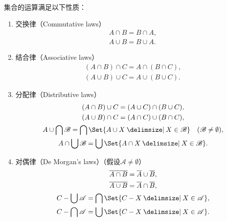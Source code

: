 \begin{property}
集合的运算满足以下性质：
\begin{enumerate}
\item 交换律（{\rm Commutative laws}）
\begin{gather}
A \cap B = B \cap A, \label{equation:集合论.集合代数公式1} \\
A \cup B = B \cup A. \label{equation:集合论.集合代数公式2}
\end{gather}

\item 结合律（{\rm Associative laws}）
\begin{gather}
(A \cap B) \cap C = A \cap (B \cap C), \label{equation:集合论.集合代数公式3} \\
(A \cup B) \cup C = A \cup (B \cup C). \label{equation:集合论.集合代数公式4}
\end{gather}

\item 分配律（{\rm Distributive laws}）
\begin{gather}
(A \cap B) \cup C = (A \cup C) \cap (B \cup C), \label{equation:集合论.集合代数公式5} \\
(A \cup B) \cap C = (A \cap C) \cup (B \cap C), \label{equation:集合论.集合代数公式6} \\
A \cup \bigcap \mathscr{B} = \bigcap\Set{A \cup X \given X \in \mathscr{B}} \quad(\mathscr{B}\neq\emptyset), \label{equation:集合论.集合代数公式5'} \\
A \cap \bigcup \mathscr{B} = \bigcup\Set{A \cap X \given X \in \mathscr{B}}. \label{equation:集合论.集合代数公式6'}
\end{gather}

\item 对偶律（{\rm De Morgan's laws}）（假设\(\mathscr{A}\neq\emptyset\)）
\begin{gather}
\overline{A \cap B} = \overline A \cup \overline B, \label{equation:集合论.集合代数公式7} \\
\overline{A \cup B} = \overline A \cap \overline B, \label{equation:集合论.集合代数公式8} \\
C - \bigcup\mathscr{A} = \bigcap\Set{C-X \given X\in\mathscr{A}}, \label{equation:集合论.集合代数公式7'} \\
C - \bigcap\mathscr{A} = \bigcup\Set{C-X \given X\in\mathscr{A}}. \label{equation:集合论.集合代数公式8'}
\end{gather}


\end{enumerate}
\end{property}

